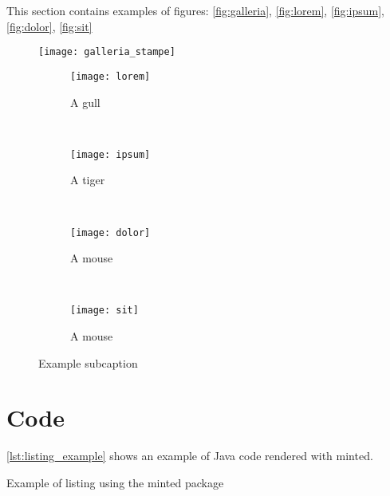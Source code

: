 This section contains examples of figures: \autoref{fig:galleria}, \autoref{fig:lorem}, \autoref{fig:ipsum}, \autoref{fig:dolor}, \autoref{fig:sit}

\begin{figure}[h] 
	\centering 
	\texttt{[image: galleria\_stampe]} 
	\label{fig:galleria} 
\end{figure}

\begin{figure}[h]
	\centering
	\begin{subfigure}[b]{0.45\textwidth}
		\texttt{[image: lorem]}
		\caption{A gull}
		\label{fig:lorem}
	\end{subfigure}
	~ %
	\begin{subfigure}[b]{0.45\textwidth}
		\texttt{[image: ipsum]}
		\caption{A tiger}
		\label{fig:ipsum}
	\end{subfigure}
	~ %
	\begin{subfigure}[b]{0.45\textwidth}
		\texttt{[image: dolor]}
		\caption{A mouse}
		\label{fig:dolor}
	\end{subfigure}
	~ %
	\begin{subfigure}[b]{0.45\textwidth}
		\texttt{[image: sit]}
		\caption{A mouse}
		\label{fig:sit}
	\end{subfigure}
	\caption{Example subcaption}\label{fig:animals}
\end{figure}


\section{Code}

\autoref{lst:listing_example} shows an example of Java code rendered with minted.

\begin{listing}
	\caption{Example of listing using the minted package}
	\label{lst:listing_example}
\end{listing}

